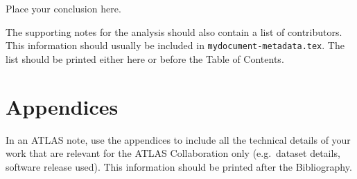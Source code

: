 \documentclass[PUB, UKenglish, texlive=2016]{\ATLASLATEXPATH atlasdoc}
\begin{document}
Place your conclusion here.


\printbibliography
%
%

\clearpage
The supporting notes for the analysis should also contain a list of contributors.
This information should usually be included in \texttt{mydocument-metadata.tex}.
The list should be printed either here or before the Table of Contents.


\clearpage
\appendix
\part*{Appendices}

In an ATLAS note, use the appendices to include all the technical details of your work
that are relevant for the ATLAS Collaboration only (e.g.\ dataset details, software release used).
This information should be printed after the Bibliography.
\end{document}
